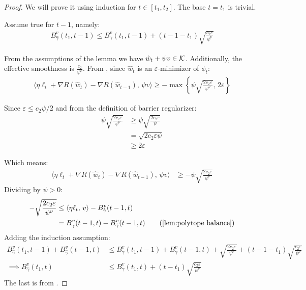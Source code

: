 \documentclass[10pt]{article}
\theoremstyle{definition}
\theoremstyle{remark}
\renewcommand{\epsilon}{\varepsilon}
\newcommand\inprod[2]{\langle #1,\,#2 \rangle}
\newcommand{\curly}[1]{ {\left\{ #1 \right\}}}
\newcommand{\barconst}{\nu}
\begin{document}
\begin{proof}
We will prove it using induction for $t\in[t_1,t_2]$. The base $t=t_1$ is trivial.

Assume true for $t-1$, namely:
\begin{align*}
    B_{\hat{\gamma}}^v(t_1,t-1) \le B_{\gamma}^v(t_1,t-1)  + (t-1-t_1)\sqrt{\frac{c_2\epsilon}{\psi^\barconst}}
\end{align*}

From the assumptions of the lemma we have $\hat{w}_t+\psi v \in \mathcal K$. Additionally, the effective smoothness is $\frac{c_2}{\psi^\barconst}$. From , since $\hat{w}_t$ is an $\epsilon$-minimizer of $\phi_t$:
\begin{align*}
    \inprod{\eta\ell_t + \nabla R(\hat{w}_t) - \nabla R(\hat{w}_{t-1})}{\psi v} \ge -\max\curly{\psi\sqrt{\frac{2c_2\epsilon}{\psi^\barconst}}, \,2\epsilon}
\end{align*}

Since $\epsilon\le c_2\psi/2$ and from the definition of barrier regularizer:
\begin{align*}
    \psi\sqrt{\frac{2c_2\epsilon}{\psi^\barconst}} &\ge \psi\sqrt{\frac{2c_2\epsilon}{\psi}}\\
    &= \sqrt{2c_2\epsilon\psi}\\
    &\ge 2\epsilon
\end{align*}

Which means:
\begin{align*}
\inprod{\eta\ell_t + \nabla R(\hat{w}_t) - \nabla R(\hat{w}_{t-1})}{\psi v} &\ge -\psi\sqrt{\frac{2c_2\epsilon}{\psi^\barconst}}
\end{align*}
Dividing by $\psi>0$:
\begin{align*}
    -\sqrt{\frac{2c_2\epsilon}{\psi^\barconst}} &\le \inprod{\eta\ell_t}{v} - B_{\hat{\gamma}}^v(t-1,t) \\
    &= B_\gamma^v(t-1,t) - B_{\hat{\gamma}}^v(t-1,t) \tag{\Cref{lem:polytope balance}}
\end{align*}
Adding the induction assumption:
\begin{align*}
   B_{\hat{\gamma}}^v(t_1,t-1) + B_{\hat{\gamma}}^v(t-1,t) &\le B_\gamma^v(t_1,t-1) + B_\gamma^v(t-1,t) + \sqrt{\frac{2c_2\epsilon}{\psi^\barconst}} + (t-1-t_1)\sqrt{\frac{c_2\epsilon}{\psi^\barconst}}\\
   \implies B_{\hat{\gamma}}^v(t_1,t) &\le B_\gamma^v(t_1,t) + (t-t_1)\sqrt{\frac{c_2\epsilon}{\psi^\barconst}}
\end{align*}
The last is from .
\end{proof}
\end{document}
